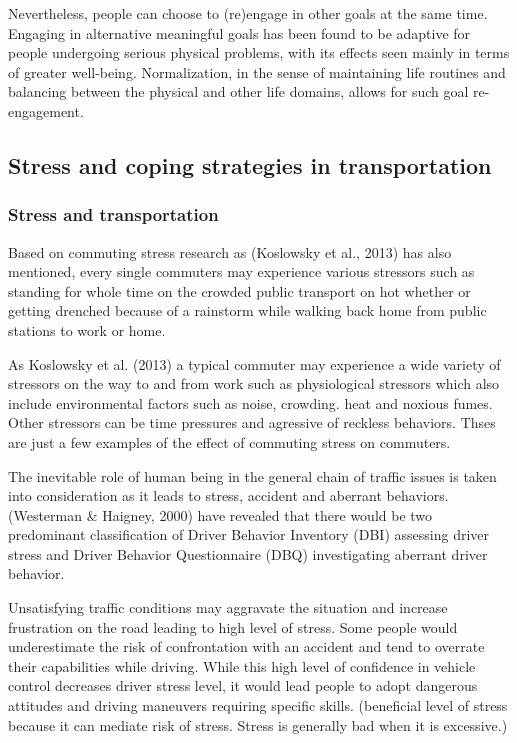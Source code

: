 \documentclass[
11pt, %
oneside, %
english, %
singlespacing, %
]{macthesis} %
\begin{document}
Nevertheless, people can choose to (re)engage in other goals at the same time. Engaging in alternative meaningful goals has been found to be adaptive for people undergoing serious physical problems, with its effects seen mainly in terms of greater well-being. Normalization, in the sense of maintaining life routines and balancing between the physical and other life domains, allows for such goal re-engagement.

\hypertarget{stress-and-coping-strategies-in-transportation}{%
\subsection{Stress and coping strategies in transportation}\label{stress-and-coping-strategies-in-transportation}}

\hypertarget{stress-and-transportation-1}{%
\subsubsection{Stress and transportation}\label{stress-and-transportation-1}}

Based on commuting stress research as (Koslowsky et al., 2013) has also mentioned, every single commuters may experience various stressors such as standing for whole time on the crowded public transport on hot whether or getting drenched because of a rainstorm while walking back home from public stations to work or home.

As Koslowsky et al. (2013) a typical commuter may experience a wide variety of stressors on the way to and from work such as physiological stressors which also include environmental factors such as noise, crowding. heat and noxious fumes. Other stressors can be time pressures and agressive of reckless behaviors. Thses are just a few examples of the effect of commuting stress on commuters.

The inevitable role of human being in the general chain of traffic issues is taken into consideration as it leads to stress, accident and aberrant behaviors. (Westerman \& Haigney, 2000) have revealed that there would be two predominant classification of Driver Behavior Inventory (DBI) assessing driver stress and Driver Behavior Questionnaire (DBQ) investigating aberrant driver behavior.

Unsatisfying traffic conditions may aggravate the situation and increase frustration on the road leading to high level of stress. Some people would underestimate the risk of confrontation with an accident and tend to overrate their capabilities while driving. While this high level of confidence in vehicle control decreases driver stress level, it would lead people to adopt dangerous attitudes and driving maneuvers requiring specific skills. (beneficial level of stress because it can mediate risk of stress. Stress is generally bad when it is excessive.)
\end{document}
